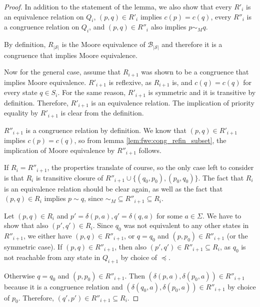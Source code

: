 \begin{proof}
	In addition to the statement of the lemma, we also show that every $R'_i$ is an equivalence relation on $Q_i$, $(p, q) \in R'_i$ implies $c(p) = c(q)$, every $R''_i$ is a congruence relation on $Q_i$, and $(p, q) \in R''_i$ also implies $p \sim_M q$.
	
	By definition, $R_{|\mathcal{S}|}$ is the Moore equivalence of $\mathcal{B}_{|\mathcal{S}|}$ and therefore it is a congruence that implies Moore equivalence.
	\vspace*{8pt}
	
	Now for the general case, assume that $R_{i+1}$ was shown to be a congruence that implies Moore equivalence. $R'_{i+1}$ is reflexive, as $R_{i+1}$ is, and $c(q) = c(q)$ for every state $q \in S_i$. For the same reason, $R'_{i+1}$ is symmetric and it is transitive by definition. Therefore, $R'_{i+1}$ is an equivalence relation. The implication of priority equality by $R'_{i+1}$ is clear from the definition.
	\vspace*{8pt}
	
	$R''_{i+1}$ is a congruence relation by definition. We know that $(p, q) \in R'_{i+1}$ implies $c(p) = c(q)$, so from lemma \ref{lem:fwe:cong_refin_subset}, the implication of Moore equivalence by $R''_{i+1}$ follows.
	\vspace*{8pt}
	
	If $R_i = R''_{i+1}$, the properties translate of course, so the only case left to consider is that $R_i$ is transitive closure of $R''_{i+1} \cup \{(q_0, p_0), (p_0, q_0)\}$. The fact that $R_i$ is an equivalence relation should be clear again, as well as the fact that $(p, q) \in R_i$ implies $p \sim q$, since $\sim_M \subseteq R''_{i+1} \subseteq R_i$.
	
	Let $(p, q) \in R_i$ and $p' = \delta(p, a), q' = \delta(q, a)$ for some $a \in \Sigma$. We have to show that also $(p', q') \in R_i$. Since $q_0$ was not equivalent to any other states in $R''_{i+1}$, we either have $(p, q) \in R''_{i+1}$, or $q = q_0$ and $(p, p_0) \in R''_{i+1}$ (or the symmetric case). If $(p, q) \in R''_{i+1}$, then also $(p', q') \in R''_{i+1} \subseteq R_i$, as $q_0$ is not reachable from any state in $Q_{i+1}$ by choice of $\preceq$. 
	
	Otherwise $q = q_0$ and $(p, p_0) \in R''_{i+1}$. Then $(\delta(p, a), \delta(p_0, a)) \in R''_{i+1}$ because it is a congruence relation and $(\delta(q_0, a), \delta(p_0, a)) \in R''_{i+1}$ by choice of $p_0$. Therefore, $(q', p') \in R''_{i+1} \subseteq R_i$.
\end{proof}

